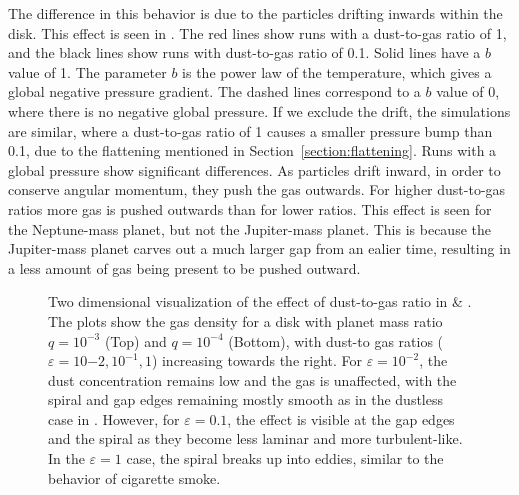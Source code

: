 \documentclass[onecolumn]{report}
\newcommand{\epsi}{\varepsilon}
\begin{document}
The difference in this behavior is due to the particles drifting inwards within the disk. This effect is seen in . The red lines show runs with a dust-to-gas ratio of 1, and the black lines show runs with dust-to-gas ratio of 0.1. Solid lines have a $b$ value of 1. The parameter $b$ is the power law of the temperature, which gives a global negative pressure gradient. The dashed lines correspond to a $b$ value of 0, where there is no negative global pressure. If we exclude the drift, the simulations are similar, where a dust-to-gas ratio of 1 causes a smaller pressure bump than 0.1, due to the flattening mentioned in Section~\ref{section:flattening}. Runs with a global pressure show significant differences. As particles drift inward, in order to conserve angular momentum, they push the gas outwards. For higher dust-to-gas ratios more gas is pushed outwards than for lower ratios. This effect is seen for the Neptune-mass planet, but not the Jupiter-mass planet. This is because the Jupiter-mass planet carves out a much larger gap from an ealier time, resulting in a less amount of gas being present to be pushed outward. 

\begin{figure}
  \begin{center}
  \end{center}
  \caption{Two dimensional visualization of the effect of dust-to-gas ratio in  \& . The plots show the gas density for a disk with 	    planet mass ratio $q=10^{-3}$ (Top) and $q=10^{-4}$ (Bottom), with dust-to gas ratios ($\epsi=10{-2}, 10^{-1}, 1$) increasing towards the right. For $\epsi=10^{-2}$, the dust concentration remains low and the gas is unaffected, with the spiral and gap edges remaining mostly smooth as in the dustless case in . However, for $\epsi=0.1$, the effect is visible at the gap edges and the spiral as they become less laminar and more turbulent-like. In the $\epsi=1$ case, the spiral breaks up into eddies, similar to the behavior of cigarette smoke.}
  \label{fig:jupnepd2g}
\end{figure}
\end{document}

